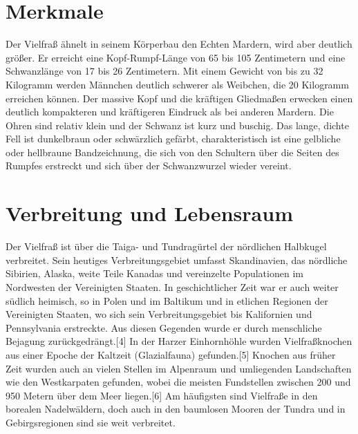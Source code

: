 \documentclass{scrartcl}
\begin{document}
\section{Merkmale}
Der Vielfraß ähnelt in seinem Körperbau den Echten Mardern, wird aber deutlich größer. Er erreicht eine Kopf-Rumpf-Länge von 65 bis 105 Zentimetern und eine Schwanzlänge von 17 bis 26 Zentimetern. Mit einem Gewicht von bis zu 32 Kilogramm werden Männchen deutlich schwerer als Weibchen, die 20 Kilogramm erreichen können. Der massive Kopf und die kräftigen Gliedmaßen erwecken einen deutlich kompakteren und kräftigeren Eindruck als bei anderen Mardern. Die Ohren sind relativ klein und der Schwanz ist kurz und buschig. Das lange, dichte Fell ist dunkelbraun oder schwärzlich gefärbt, charakteristisch ist eine gelbliche oder hellbraune Bandzeichnung, die sich von den Schultern über die Seiten des Rumpfes erstreckt und sich über der Schwanzwurzel wieder vereint. 

\section{Verbreitung und Lebensraum}
Der Vielfraß ist über die Taiga- und Tundragürtel der nördlichen Halbkugel verbreitet. Sein heutiges Verbreitungsgebiet umfasst Skandinavien, das nördliche Sibirien, Alaska, weite Teile Kanadas und vereinzelte Populationen im Nordwesten der Vereinigten Staaten. In geschichtlicher Zeit war er auch weiter südlich heimisch, so in Polen und im Baltikum und in etlichen Regionen der Vereinigten Staaten, wo sich sein Verbreitungsgebiet bis Kalifornien und Pennsylvania erstreckte. Aus diesen Gegenden wurde er durch menschliche Bejagung zurückgedrängt.[4] In der Harzer Einhornhöhle wurden Vielfraßknochen aus einer Epoche der Kaltzeit (Glazialfauna) gefunden.[5] Knochen aus früher Zeit wurden auch an vielen Stellen im Alpenraum und umliegenden Landschaften wie den Westkarpaten gefunden, wobei die meisten Fundstellen zwischen 200 und 950 Metern über dem Meer liegen.[6]
Am häufigsten sind Vielfraße in den borealen Nadelwäldern, doch auch in den baumlosen Mooren der Tundra und in Gebirgsregionen sind sie weit verbreitet. 
\end{document}
